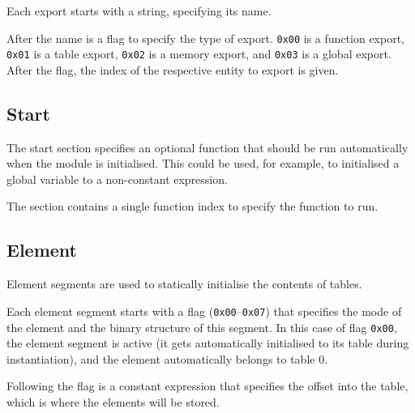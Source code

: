 \documentclass[10pt,a4paper]{article}
\newcommand{\hex}[1]{\texttt{#1}}
\begin{document}


Each export starts with a string, specifying its name.

After the name is a flag to specify the type of export.
\hex{0x00} is a function export, \hex{0x01} is a table export, \hex{0x02} is a memory export, and \hex{0x03} is a global export.
After the flag, the index of the respective entity to export is given.






\subsection*{Start}

The start section specifies an optional function that should be run automatically when the module is initialised.
This could be used, for example, to initialised a global variable to a non-constant expression.

The section contains a single function index to specify the function to run.




\subsection*{Element}

Element segments are used to statically initialise the contents of tables.



Each element segment starts with a flag (\hex{0x00}--\hex{0x07}) that specifies the mode of the element and the binary structure of this segment. In this case of flag \hex{0x00}, the element segment is active (it gets automatically initialised to its table during instantiation), and the element automatically belongs to table 0.

Following the flag is a constant expression that specifies the offset into the table, which is where the elements will be stored.
\end{document}

